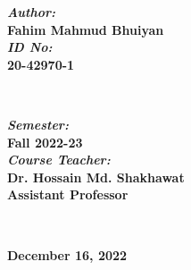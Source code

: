 \begin{titlepage}

\begin{minipage}{0.4\textwidth}
\begin{flushleft} \large
\emph{ \textbf{Author:}}\\
 \textbf{Fahim Mahmud Bhuiyan} %
\\[1.2em]
\emph{ \textbf{ID No:}}\\
 \textbf{20-42970-1} \\[1.2em]
\end{flushleft}
\end{minipage}
~
\begin{minipage}{0.4\textwidth}
\begin{flushright} \large
\emph{ \textbf{Semester:}} \\
 \textbf{Fall 2022-23} \\[1.2em] %
\emph{ \textbf{Course Teacher:}} \\
 \textbf{Dr. Hossain Md. Shakhawat} %
\\ \textbf{Assistant Professor}
\end{flushright}
\end{minipage}\\[2cm]
\makeatother



{\large  \textbf{December 16, 2022}}\\[2cm] %

\vfill %

\end{titlepage}